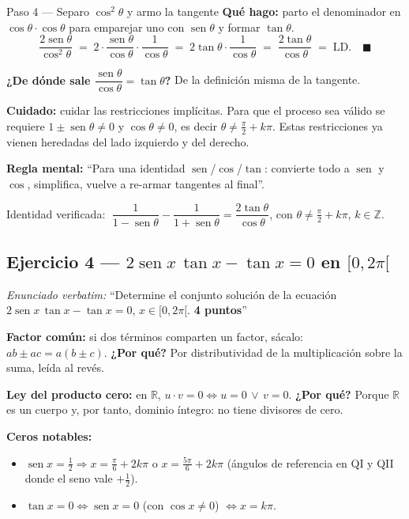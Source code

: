 \documentclass[11pt]{article}
\DeclareMathOperator{\sen}{sen}
\begin{document}
\begin{paso}{Paso 4 --- Separo $\cos^2\theta$ y armo la tangente}
\textbf{Qué hago:} parto el denominador en $\cos\theta\cdot\cos\theta$ para emparejar uno con $\sen\theta$ y formar $\tan\theta$.
\[
\dfrac{2\sen\theta}{\cos^2\theta}
\;=\; 2\cdot\dfrac{\sen\theta}{\cos\theta}\cdot\dfrac{1}{\cos\theta}
\;=\; 2\tan\theta\cdot\dfrac{1}{\cos\theta}
\;=\; \dfrac{2\tan\theta}{\cos\theta}
\;=\;\text{LD}. \quad\blacksquare
\]

\textbf{¿De dónde sale $\dfrac{\sen\theta}{\cos\theta}=\tan\theta$?} De la definición misma de la tangente.

\textbf{Cuidado:} cuidar las restricciones implícitas. Para que el proceso sea válido se requiere $1\pm\sen\theta\neq 0$ y $\cos\theta\neq 0$, es decir $\theta\neq\tfrac{\pi}{2}+k\pi$. Estas restricciones ya vienen heredadas del lado izquierdo y del derecho.

\textbf{Regla mental:} ``Para una identidad $\sen$/$\cos$/$\tan$: convierte todo a $\sen$ y $\cos$, simplifica, vuelve a re-armar tangentes al final''.
\end{paso}

\begin{resp}
Identidad verificada: $\;\dfrac{1}{1-\sen\theta}-\dfrac{1}{1+\sen\theta}=\dfrac{2\tan\theta}{\cos\theta}$, con $\theta\neq\tfrac{\pi}{2}+k\pi$, $k\in\mathbb{Z}$.
\end{resp}

\subsection*{Ejercicio 4 --- $2\sen x\,\tan x-\tan x=0$ en $[0,2\pi[$}

\textit{Enunciado verbatim:} ``Determine el conjunto solución de la ecuación $2\sen x\,\tan x-\tan x=0$, $x\in[0,2\pi[$. \textbf{4 puntos}''

\begin{teo}
\textbf{Factor común:} si dos términos comparten un factor, sácalo: $ab\pm ac=a(b\pm c)$. \textbf{¿Por qué?} Por distributividad de la multiplicación sobre la suma, leída al revés.

\textbf{Ley del producto cero:} en $\mathbb{R}$, $u\cdot v=0\Leftrightarrow u=0\,\lor\, v=0$. \textbf{¿Por qué?} Porque $\mathbb{R}$ es un cuerpo y, por tanto, dominio íntegro: no tiene divisores de cero.

\textbf{Ceros notables:}
\begin{itemize}[leftmargin=*]
  \item $\sen x=\tfrac{1}{2}\Rightarrow x=\tfrac{\pi}{6}+2k\pi$ o $x=\tfrac{5\pi}{6}+2k\pi$ (ángulos de referencia en QI y QII donde el seno vale $+\tfrac{1}{2}$).
  \item $\tan x=0\Leftrightarrow \sen x=0$ (con $\cos x\neq 0$) $\Leftrightarrow x=k\pi$.
\end{itemize}
\end{teo}
\end{document}
